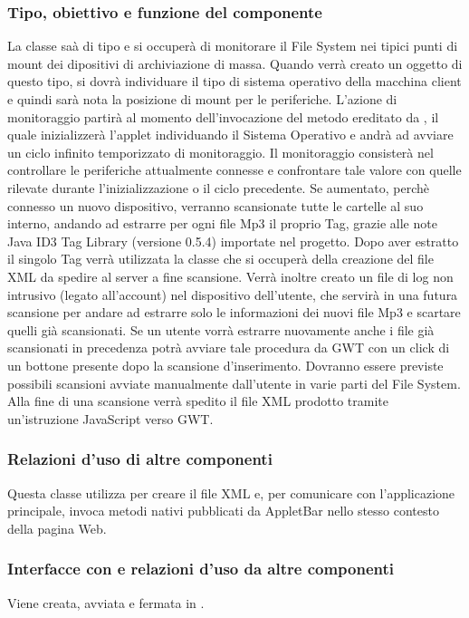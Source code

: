 \subsubsection*{Tipo, obiettivo e funzione del componente} La classe
 sa\`a di tipo  e si occuper\`a di monitorare il
File System nei tipici punti di mount dei dipositivi di archiviazione di massa.
Quando verr\`a creato un oggetto di questo tipo, si dovr\`a individuare il tipo
di sistema operativo della macchina client e quindi sar\`a nota la posizione di
mount per le periferiche. L'azione di monitoraggio partir\`a al momento
dell'invocazione del metodo  ereditato da , il quale
inizializzer\`a l'applet individuando il Sistema Operativo e andr\`a ad avviare
un ciclo infinito temporizzato di monitoraggio. Il monitoraggio consister\`a nel
controllare le periferiche attualmente connesse e confrontare tale valore con
quelle rilevate durante l'inizializzazione o il ciclo precedente. Se aumentato,
perch\`e connesso un nuovo dispositivo, verranno scansionate tutte le cartelle
al suo interno, andando ad estrarre per ogni file Mp3 il proprio Tag, grazie
alle note Java ID3 Tag Library (versione 0.5.4) importate nel progetto. Dopo
aver estratto il singolo Tag verr\`a utilizzata la classe  che
si occuper\`a della creazione del file XML da spedire al server a fine
scansione. Verr\`a inoltre creato un file di log non intrusivo (legato
all'account) nel dispositivo dell'utente, che servir\`a in una futura scansione
per andare ad estrarre solo le informazioni dei nuovi file Mp3 e scartare quelli
gi\`a scansionati. Se un utente vorr\`a estrarre nuovamente anche i file gi\`a
scansionati in precedenza potr\`a avviare tale procedura da GWT con un click di
un bottone presente dopo la scansione d'inserimento. Dovranno essere previste
possibili scansioni avviate manualmente dall'utente in varie parti del File
System. Alla fine di una scansione verr\`a spedito il file XML prodotto tramite
un'istruzione JavaScript verso GWT.

\subsubsection*{Relazioni d'uso di altre componenti}
Questa classe utilizza  per creare il file XML e, per
comunicare con l'applicazione principale, invoca metodi nativi pubblicati da
AppletBar nello stesso contesto della pagina Web.

\subsubsection*{Interfacce con e relazioni d'uso da altre componenti}
Viene creata, avviata e fermata in .

